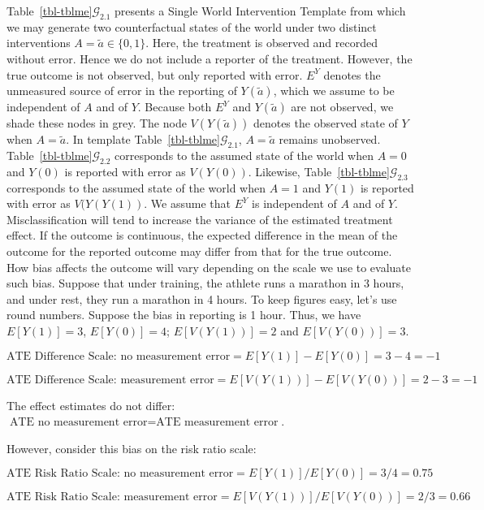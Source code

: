 \documentclass[
  single column]{article}
\begin{document}
Table~\ref{tbl-tblme}\(\mathcal{G}_{2.1}\) presents a Single World
Intervention Template from which we may generate two counterfactual
states of the world under two distinct interventions
\(A = \tilde{a} \in \{0,1\}\). Here, the treatment is observed and
recorded without error. Hence we do not include a reporter of the
treatment. However, the true outcome is not observed, but only reported
with error. \(E^Y\) denotes the unmeasured source of error in the
reporting of \(Y(\tilde{a})\), which we assume to be independent of
\(A\) and of \(Y\). Because both \(E^Y\) and \(Y(\tilde{a})\) are not
observed, we shade these nodes in grey. The node \(V(Y(\tilde{a}))\)
denotes the observed state of \(Y\) when \(A = \tilde{a}\). In template
Table~\ref{tbl-tblme}\(\mathcal{G}_{2.1}\), \(A = \tilde{a}\) remains
unobserved. Table~\ref{tbl-tblme}\(\mathcal{G}_{2.2}\) corresponds to
the assumed state of the world when \(A=0\) and \(Y(0)\) is reported
with error as \(V(Y(0))\). Likewise,
Table~\ref{tbl-tblme}\(\mathcal{G}_{2.3}\) corresponds to the assumed
state of the world when \(A=1\) and \(Y(1)\) is reported with error as
\(V(Y(Y(1))\). We assume that \(E^Y\) is independent of \(A\) and of
\(Y\). Misclassification will tend to increase the variance of the
estimated treatment effect. If the outcome is continuous, the expected
difference in the mean of the outcome for the reported outcome may
differ from that for the true outcome. How bias affects the outcome will
vary depending on the scale we use to evaluate such bias. Suppose that
under training, the athlete runs a marathon in 3 hours, and under rest,
they run a marathon in 4 hours. To keep figures easy, let's use round
numbers. Suppose the bias in reporting is 1 hour. Thus, we have
\(E[Y(1)] = 3\), \(E[Y(0)] = 4\); \(E[V(Y(1))] = 2\) and
\(E[V(Y(0))] = 3\).

\[
\text{ATE Difference Scale: no measurement error} = E[Y(1)] - E[Y(0)] = 3 - 4 = -1
\]

\[
\text{ATE Difference Scale: measurement error} = E[V(Y(1))] - E[V(Y(0))] = 2 - 3 = -1
\]

The effect estimates do not differ:
\(\text{ATE no measurement error} = \text{ATE measurement error}\).

However, consider this bias on the risk ratio scale:

\[
\text{ATE Risk Ratio Scale: no measurement error} = E[Y(1)] / E[Y(0)] = 3 / 4 = 0.75
\]

\[
\text{ATE Risk Ratio Scale: measurement error} = E[V(Y(1))] / E[V(Y(0))] = 2 / 3 = 0.66
\]
\end{document}
